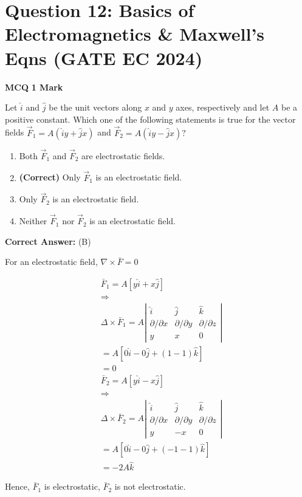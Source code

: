 \documentclass[11pt,a4paper]{article}
\begin{document}
\section*{Question 12: Basics of Electromagnetics \& Maxwell's Eqns (GATE EC 2024)}
\noindent \textbf{\color{primary}MCQ} \hfill \textbf{\color{secondary}1 Mark}


\noindent Let $\hat{i}$ and $\hat{j}$ be the unit vectors along $x$ and $y$ axes, respectively and let $A$ be a positive constant. Which one of the following statements is true for the vector fields $\vec{F}_{1}=A(\hat{i} y+\hat{j} x)$ and $\vec{F}_{2}=A(\hat{i} y-\hat{j} x) ?$


\begin{enumerate}[label=(\Alph*)]
    \item Both $\vec{F}_{1}$ and $\vec{F}_{2}$ are electrostatic fields.
    \item \textbf{(Correct)} Only $\vec{F}_{1}$ is an electrostatic field.
    \item Only $\vec{F}_{2}$ is an electrostatic field.
    \item Neither $\vec{F}_{1}$ nor $\vec{F}_{2}$ is an electrostatic field.
\end{enumerate}

\noindent \textbf{Correct Answer:} (B)

\begin{tcolorbox}[solbox, title=Detailed Solution -- Question 12]
For an electrostatic field, $\nabla \times \bar{F}=0$

 
\[
\begin{aligned}
& \bar{F}_{1}=A[y \hat{i}+x \hat{j}] \\
& \Rightarrow \\
& \Delta \times \bar{F}_{1}=A\left|\begin{array}{ccc}
\hat{i} & \hat{j} & \hat{k} \\
\partial / \partial x & \partial / \partial y & \partial / \partial z \\
y & x & 0
\end{array}\right| \\
& =A[0 \hat{i}-0 \hat{j}+(1-1) \hat{k}] \\
& =0 \\
& \bar{F}_{2}=A[y \hat{i}-x \hat{j}] \\
& \Rightarrow \\
& \Delta \times \bar{F}_{2}=A\left|\begin{array}{ccc}
\hat{i} & \hat{j} & \hat{k} \\
\partial / \partial x & \partial / \partial y & \partial / \partial z \\
y & -x & 0
\end{array}\right| \\
& =A[0 \hat{i}-0 \hat{j}+(-1-1) \hat{k}] \\
& =-2 A \hat{k}
\end{aligned}
\]

Hence, $\bar{F}_{1}$ is electrostatic, $\bar{F}_{2}$ is not electrostatic.
\end{tcolorbox}
\end{document}
